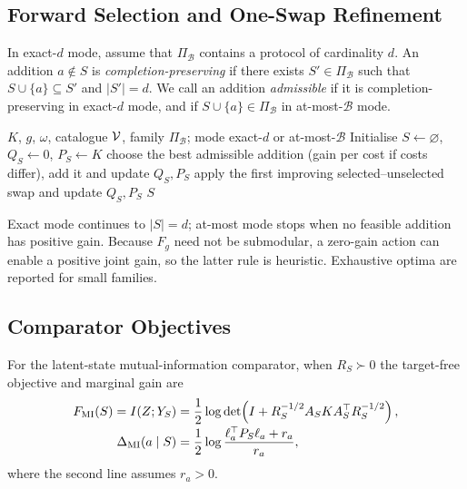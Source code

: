 \subsection{Forward Selection and One-Swap Refinement}
\label{sec:app-design-search}

In exact-$d$ mode, assume that $\Pi_{\mathcal B}$ contains a protocol of
cardinality $d$. An addition $a\notin S$ is \emph{completion-preserving} if
there exists $S'\in\Pi_{\mathcal B}$ such that
$S\cup\{a\}\subseteq S'$ and $|S'|=d$. We call an addition \emph{admissible}
if it is completion-preserving in exact-$d$ mode, and if
$S\cup\{a\}\in\Pi_{\mathcal B}$ in at-most-$\mathcal B$ mode.

\begin{algorithm}[H]
\caption{Exact-gain forward selection with one-swap refinement}
\label{alg:forward-swap}
\begin{algorithmic}[1]
\Require $K$, $g$, $\omega$, catalogue $\mathcal{V}$, family $\Pi_{\mathcal B}$; mode
exact-$d$ or at-most-$\mathcal B$
\State Initialise $S\gets\varnothing$, $Q_S\gets0$, $P_S\gets K$
  \State choose the best admissible addition (gain per cost
  if costs differ), add it and update $Q_S,P_S$
\EndWhile
{}
  \State apply the first improving selected--unselected swap and update $Q_S,P_S$
\EndWhile
\State \Return $S$
\end{algorithmic}
\end{algorithm}

Exact mode continues to $|S|=d$; at-most mode stops when no feasible addition
has positive gain. Because $F_g$ need not be submodular, a zero-gain action can
enable a positive joint gain, so the latter rule is heuristic. Exhaustive optima are
reported for small families.

\subsection{Comparator Objectives}
\label{sec:app-design-comparators}

For the latent-state mutual-information comparator, when $R_S\succ0$ the
target-free objective and marginal gain are
\begin{align}
F_{\rm MI}(S)=I(Z;Y_S)
&=\frac12\log\det\!\left(I+R_S^{-1/2}A_SKA_S^\top R_S^{-1/2}\right),
\label{eq:mi-baseline}
\\[-2pt]
\Delta_{\rm MI}(a\mid S)
&=\frac12\log\frac{\ell_a^\top P_S\ell_a+r_a}{r_a},
\label{eq:mi-gain}
\end{align}
where the second line assumes $r_a>0$.

